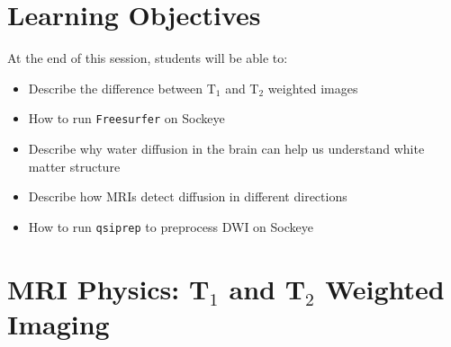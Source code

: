 \documentclass[aspectratio=169,xcolor=dvipsnames]{beamer}
\begin{document}
\section{Learning Objectives}

\begin{frame}
At the end of this session, students will be able to:
\begin{itemize}
\item Describe the difference between T$_{1}$ and T$_{2}$ weighted images
\item How to run \texttt{Freesurfer} on Sockeye
\item Describe why water diffusion in the brain can help us understand white matter structure
\item Describe how MRIs detect diffusion in different directions
\item How to run \texttt{qsiprep} to preprocess DWI on Sockeye
\end{itemize}
\end{frame}

\section{MRI Physics: T$_{1}$ and T$_{2}$ Weighted Imaging}
\end{document}
